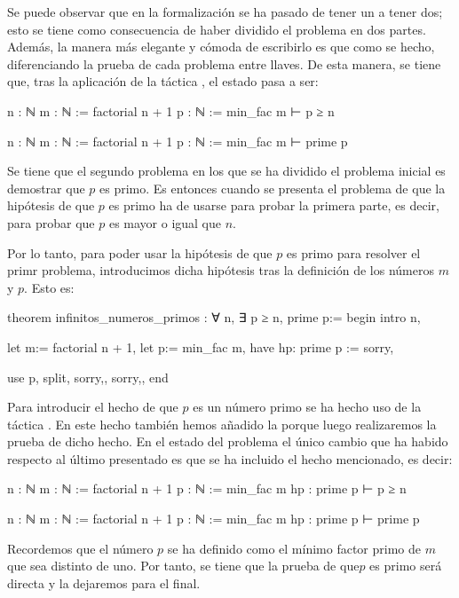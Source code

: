 Se puede observar que en la formalización se ha pasado de tener un
 a tener dos; esto se tiene como consecuencia de haber
dividido el problema en dos partes. Además, la manera más elegante y cómoda
de escribirlo es que como se hecho, diferenciando la prueba de cada problema
entre llaves. De esta manera, se tiene que, tras la aplicación de la táctica
, el estado pasa a ser:
\begin{leancode}
n : ℕ
m : ℕ := factorial n + 1
p : ℕ := min_fac m
⊢ p ≥ n

n : ℕ
m : ℕ := factorial n + 1
p : ℕ := min_fac m
⊢ prime p
\end{leancode}


Se tiene que el segundo problema en los que se ha dividido el problema inicial
es demostrar que \(p\) es primo. Es entonces cuando se presenta el problema de
que la hipótesis de que \(p\) es primo ha de usarse para probar la primera
parte, es decir, para probar que \(p\) es mayor o igual que \(n\).

Por lo tanto, para poder usar la hipótesis de que \(p\) es primo para resolver
el primr problema, introducimos dicha hipótesis tras la definición de los
números \(m\) y \(p\). Esto es:
\begin{leancode}
theorem infinitos_numeros_primos : ∀ n, ∃ p ≥ n, prime p:=
begin
  intro n,

  let m:= factorial n + 1,
  let p:= min_fac m,
  have hp: prime p := sorry,

  use p,
  split,
  {sorry,},
  {sorry,},
end
\end{leancode}

Para introducir el hecho de que \(p\) es un número primo se ha hecho
uso de la táctica . En este hecho también hemos
añadido la  porque luego realizaremos la prueba de
dicho hecho. En el estado del problema el único cambio que ha habido
respecto al último presentado es que se ha incluido el hecho
mencionado, es decir:
\begin{leancode}
n : ℕ
m : ℕ := factorial n + 1
p : ℕ := min_fac m
hp : prime p
⊢ p ≥ n

n : ℕ
m : ℕ := factorial n + 1
p : ℕ := min_fac m
hp : prime p
⊢ prime p
\end{leancode}

Recordemos que el número \(p\) se ha definido como el mínimo factor primo de
\(m\) que sea distinto de uno. Por tanto, se tiene que la prueba de que\(p\)
es primo será directa y la dejaremos para el final.

